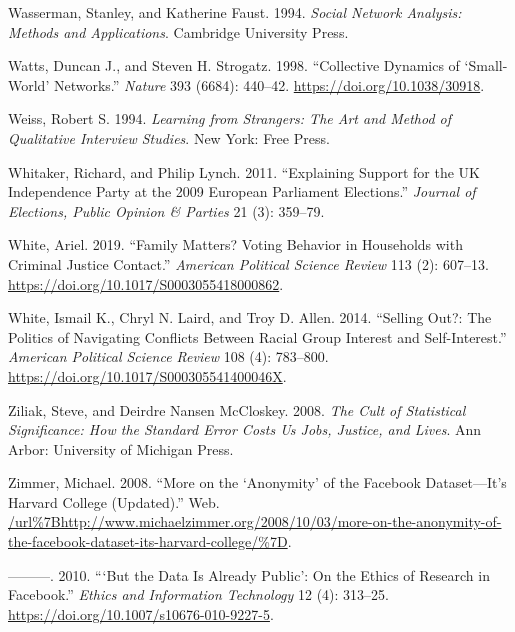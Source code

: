 \documentclass{book}
\newlength{\cslhangindent}
\newlength{\cslentryspacingunit} %
\newenvironment{CSLReferences}[2] %
 {%
  \setlength{\parindent}{0pt}
  \ifodd #1
  \let\oldpar\par
  \def\par{\hangindent=\cslhangindent\oldpar}
  \fi
  \setlength{\parskip}{#2\cslentryspacingunit}
 }%
 {}
\begin{document}
\begin{CSLReferences}{1}{0}
\leavevmode{}%
Wasserman, Stanley, and Katherine Faust. 1994. \emph{Social Network Analysis:
Methods and Applications}. Cambridge University Press.

\leavevmode{}%
Watts, Duncan J., and Steven H. Strogatz. 1998. {``Collective Dynamics of
{`Small-World'} Networks.''} \emph{Nature} 393 (6684): 440--42.
\url{https://doi.org/10.1038/30918}.

\leavevmode{}%
Weiss, Robert S. 1994. \emph{Learning from Strangers: The Art and Method of
Qualitative Interview Studies}. New York: Free Press.

\leavevmode{}%
Whitaker, Richard, and Philip Lynch. 2011. {``Explaining Support for the UK
Independence Party at the 2009 European Parliament Elections.''} \emph{Journal
of Elections, Public Opinion \& Parties} 21 (3): 359--79.

\leavevmode{}%
White, Ariel. 2019. {``Family Matters? Voting Behavior in Households with
Criminal Justice Contact.''} \emph{American Political Science Review} 113 (2):
607--13. \url{https://doi.org/10.1017/S0003055418000862}.

\leavevmode{}%
White, Ismail K., Chryl N. Laird, and Troy D. Allen. 2014. {``Selling {Out}?:
{The} {Politics} of {Navigating} {Conflicts} Between {Racial} {Group}
{Interest} and {Self}-Interest.''} \emph{American Political Science Review}
108 (4): 783--800. \url{https://doi.org/10.1017/S000305541400046X}.

\leavevmode{}%
Ziliak, Steve, and Deirdre Nansen McCloskey. 2008. \emph{The Cult of
Statistical Significance: How the Standard Error Costs Us Jobs, Justice, and
Lives}. Ann Arbor: University of Michigan Press.

\leavevmode{}%
Zimmer, Michael. 2008. {``More on the {`Anonymity'} of the Facebook
Dataset---It's Harvard College (Updated).''} Web.
\url{/url\%7Bhttp://www.michaelzimmer.org/2008/10/03/more-on-the-anonymity-of-the-facebook-dataset-its-harvard-college/\%7D}.

\leavevmode{}%
---------. 2010. {``{`But the Data Is Already Public'}: On the Ethics of
Research in Facebook.''} \emph{Ethics and Information Technology} 12 (4):
313--25. \url{https://doi.org/10.1007/s10676-010-9227-5}.

\end{CSLReferences}

\backmatter
\end{document}
